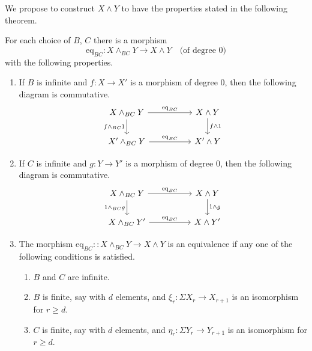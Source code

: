 \documentclass[../main]{subfiles}
\begin{document}
We propose to construct $X \wedge Y$ to have the properties stated in the following theorem.
\begin{theorem}\label{thm:p3ch04.2}
    For each choice of $B$, $C$ there is a morphism
    \[
        \mathrm{eq}_{BC} \colon X \wedge_{BC} Y \longrightarrow X \wedge Y \quad \text{(of degree 0)}
    \]
    with the following properties.
    \begin{enumerate}[label=(\roman*)] 
        \item If $B$ is infinite and $f \colon X \longrightarrow X'$ is a morphism of degree 0, then the following diagram is commutative.
            \[
            \begin{tikzcd}[column sep=5em] 
                X \wedge_{BC} Y & X \wedge Y \\
                X' \wedge_{BC} Y & X' \wedge Y
                \arrow[from=1-1, to=1-2, "\mathrm{eq}_{BC}"]
                \arrow[from=1-1, to=2-1, "f \wedge_{BC} 1"'] 
                \arrow[from=1-2, to=2-2, "f \wedge 1"]
                \arrow[from=2-1, to=2-2, "\mathrm{eq}_{BC}"] 
            \end{tikzcd}
            \]
        \item If $C$ is infinite and $g: Y \longrightarrow Y'$ is a morphism of degree 0, then the following diagram is commutative.
            \[
            \begin{tikzcd}[column sep=5em] 
                X \wedge_{BC} Y & X \wedge Y \\
                X \wedge_{BC} Y' & X \wedge Y'
                \arrow[from=1-1, to=1-2, "\mathrm{eq}_{BC}"]
                \arrow[from=1-1, to=2-1, "1 \wedge_{BC} g"'] 
                \arrow[from=1-2, to=2-2, "1 \wedge g"]
                \arrow[from=2-1, to=2-2, "\mathrm{eq}_{BC}"] 
            \end{tikzcd}
            \]
        \item The morphism $\mathrm{eq}_{BC} \colon: X \wedge_{BC} Y \longrightarrow X \wedge Y$ is an equivalence if any one of the following conditions is satisfied.
            \begin{enumerate}[label=(\alph*)] 
                \item $B$ and $C$ are infinite.
                \item $B$ is finite, say with $d$ elements, and $\xi_r \colon \Sigma X_r \longrightarrow X_{r+1}$ is an isomorphism for $r \geq d$.
                \item $C$ is finite, say with $d$ elements, and $\eta_r \colon \Sigma Y_r \longrightarrow Y_{r+1}$ is an isomorphism for $r \geq d$.
            \end{enumerate}
    \end{enumerate}
\end{theorem}
\end{document}
